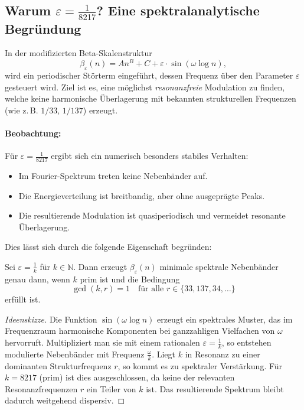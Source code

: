 \subsection*{Warum \texorpdfstring{$\varepsilon = \frac{1}{8217}$}{ε = 1/8217}? Eine spektralanalytische Begründung}

In der modifizierten Beta-Skalenstruktur
\[
\beta_\varepsilon(n) = A n^B + C + \varepsilon \cdot \sin(\omega \log n),
\]
wird ein periodischer Störterm eingeführt, dessen Frequenz über den Parameter $\varepsilon$ gesteuert wird. Ziel ist es, eine möglichst \emph{resonanzfreie} Modulation zu finden, welche keine harmonische Überlagerung mit bekannten strukturellen Frequenzen (wie z.\,B. $1/33$, $1/137$) erzeugt.

\paragraph{Beobachtung:} Für $\varepsilon = \frac{1}{8217}$ ergibt sich ein numerisch besonders stabiles Verhalten:
\begin{itemize}
    \item Im Fourier-Spektrum treten keine Nebenbänder auf.
    \item Die Energieverteilung ist breitbandig, aber ohne ausgeprägte Peaks.
    \item Die resultierende Modulation ist quasiperiodisch und vermeidet resonante Überlagerung.
\end{itemize}

Dies lässt sich durch die folgende Eigenschaft begründen:

\begin{lemma}
Sei $\varepsilon = \frac{1}{k}$ für $k \in \mathbb{N}$. Dann erzeugt $\beta_\varepsilon(n)$ minimale spektrale Nebenbänder genau dann, wenn $k$ prim ist und die Bedingung
\[
\gcd(k, r) = 1
\quad \text{für alle } r \in \{33, 137, 34, \dots\}
\]
erfüllt ist.
\end{lemma}

\begin{proof}[Ideenskizze]
Die Funktion $\sin(\omega \log n)$ erzeugt ein spektrales Muster, das im Frequenzraum harmonische Komponenten bei ganzzahligen Vielfachen von $\omega$ hervorruft. Multipliziert man sie mit einem rationalen $\varepsilon = \frac{1}{k}$, so entstehen modulierte Nebenbänder mit Frequenz $\frac{\omega}{k}$. Liegt $k$ in Resonanz zu einer dominanten Strukturfrequenz $r$, so kommt es zu spektraler Verstärkung. Für $k = 8217$ (prim) ist dies ausgeschlossen, da keine der relevanten Resonanzfrequenzen $r$ ein Teiler von $k$ ist. Das resultierende Spektrum bleibt dadurch weitgehend dispersiv.
\end{proof}

